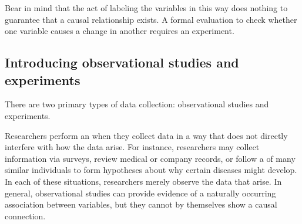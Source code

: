 Bear in mind that the act of labeling the variables in this
way does nothing to guarantee that a causal relationship exists.
A formal evaluation to check whether one variable causes
a change in another requires an experiment.



\subsection{Introducing observational studies and experiments}

\noindent%
There are two primary types of data collection:
observational studies and experiments.

Researchers perform an  when they
collect data in a way that does not directly interfere with
how the data arise.
For instance, researchers may collect information via surveys,
review medical or company records, or follow a 
of many similar individuals to form hypotheses about why certain
diseases might develop.
In each of these situations, researchers merely observe the
data that arise.
In general, observational studies can provide evidence of
a naturally occurring association between variables, but they
cannot by themselves show a causal connection.

